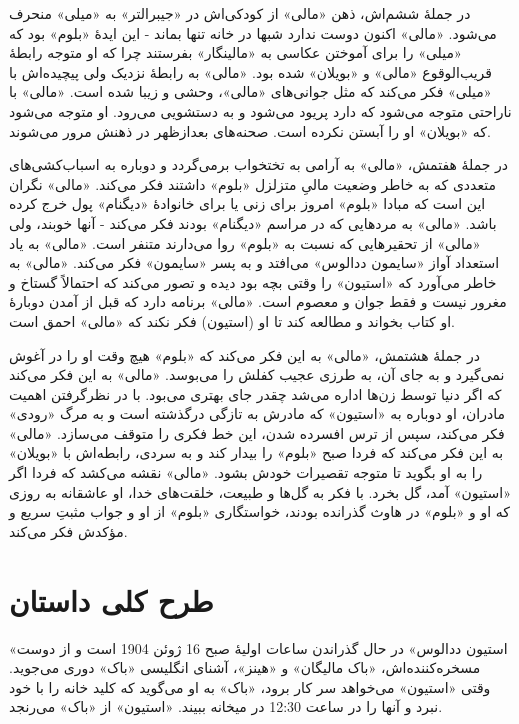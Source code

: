 \documentclass[12pt]{book}
\newcommand{\noun}[1]{«{#1}»}
\begin{document}
    در جملۀ ششم‌اش، ذهن \noun{مالی} از کودکی‌اش در \noun{جیبرالتر} به \noun{میلی} منحرف می‌شود. \noun{مالی} اکنون دوست ندارد شبها در خانه تنها بماند - این ایدۀ \noun{بلوم} بود که \noun{میلی} را برای آموختن عکاسی به \noun{مالینگار} بفرستند چرا که او متوجه رابطۀ قریب‌الوقوع \noun{مالی} و \noun{بویلان} شده بود. \noun{مالی} به رابطۀ نزدیک ولی پیچیده‌اش با \noun{میلی} فکر می‌کند که مثل جوانی‌های \noun{مالی}، وحشی و زیبا شده است. \noun{مالی} با ناراحتی متوجه می‌شود که دارد پریود می‌شود و به دستشویی می‌رود. او متوجه می‌شود که \noun{بویلان} او را آبستن نکرده است. صحنه‌های بعدازظهر در ذهنش مرور می‌شوند.

    در جملۀ هفتمش، \noun{مالی} به آرامی به تختخواب برمی‌گردد و دوباره به اسباب‌کشی‌های متعددی که به خاطر وضعیت مالیِ متزلزل \noun{بلوم} داشتند فکر می‌کند. \noun{مالی} نگران این است که مبادا \noun{بلوم} امروز برای زنی یا برای خانوادۀ \noun{دیگنام} پول خرج کرده باشد. \noun{مالی} به مردهایی که در مراسم \noun{دیگنام} بودند فکر می‌کند - آنها خوبند، ولی \noun{مالی} از تحقیرهایی که نسبت به \noun{بلوم} روا می‌دارند متنفر است. \noun{مالی} به یاد استعداد آواز \noun{سایمون ددالوس‬} می‌افتد و به پسر \noun{سایمون}  فکر می‌کند. \noun{مالی} به خاطر می‌آورد که \noun{استیون} را وقتی بچه بود دیده و تصور می‌کند که احتمالاً گستاخ و مغرور نیست و فقط جوان و معصوم است. \noun{مالی} برنامه دارد که قبل از آمدن دوبارۀ او کتاب بخواند و مطالعه کند تا او (استیون) فکر نکند که \noun{مالی} احمق است.

    در جملۀ هشتمش، \noun{مالی} به این فکر می‌کند که \noun{بلوم} هیچ وقت او را در آغوش نمی‌گیرد و به جای آن، به طرزی عجیب کفلش را می‌بوسد. \noun{مالی} به این فکر می‌کند که اگر دنیا توسط زن‌ها اداره می‌شد چقدر جای بهتری می‌بود. با در نظرگرفتن اهمیت مادران، او دوباره به \noun{استیون} که مادرش به تازگی درگذشته است و به مرگ \noun{رودی} فکر می‌کند، سپس از ترس افسرده شدن، این خط فکری را متوقف می‌سازد. \noun{مالی} به این فکر می‌کند که فردا صبح \noun{بلوم} را بیدار کند و به سردی، رابطه‌اش با \noun{بویلان} را به او بگوید تا متوجه تقصیرات خودش بشود. \noun{مالی} نقشه می‌کشد که فردا اگر \noun{استیون} آمد، گل بخرد. با فکر به گل‌ها و طبیعت، خلقت‌های خدا، او عاشقانه به روزی که او و \noun{بلوم} در هاوث گذرانده بودند، خواستگاری‌ \noun{بلوم} از او و جواب مثبتِ سریع و مؤکدش فکر می‌کند.

    \part{طرح کلی داستان}
    \noun{استیون ددالوس} در حال گذراندن ساعات اولیۀ صبح 16 ژوئن 1904 است و از دوست مسخره‌کننده‌اش، \noun{باک مالیگان} و \noun{هینز}، آشنای انگلیسی \noun{باک} دوری می‌جوید. وقتی \noun{استیون} می‌خواهد سر کار برود، \noun{باک} به او می‌گوید که کلید خانه را با خود نبرد و آنها را در ساعت 12:30 در میخانه ببیند. \noun{استیون} از \noun{باک} می‌رنجد.
\end{document}
